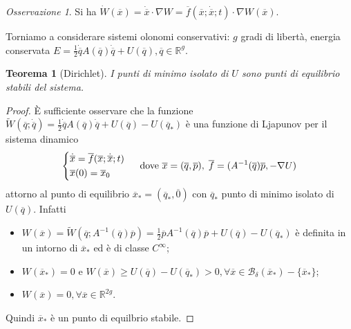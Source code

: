 \documentclass{book}
\theoremstyle{plain}
\newtheorem{teo}{Teorema}[chapter]
\theoremstyle{plain}
\theoremstyle{plain}
\theoremstyle{plain}
\theoremstyle{plain}
\theoremstyle{definition}
\theoremstyle{remark}
\newtheorem*{oss}{Osservazione}
\theoremstyle{definition}
\begin{document}
\begin{oss}
    Si ha $\dot{W}(\overline{x})=\dot{\overline{x}}\cdot \nabla W = \overline{f}(\overline{x};\dot{\overline{x}};t)\cdot \nabla W(\overline{x})$.
\end{oss}

\noindent Torniamo a considerare sistemi olonomi conservativi: $g$ gradi di libertà, energia conservata $E=\frac{1}{2}\dot{\overline{q}}A\left(\overline{q}\right)\dot{\overline{q}}+U\left(\overline{q}\right), \overline{q} \in \mathbb{R}^g$.

\begin{teo}[Dirichlet]
    I punti di minimo isolato di $U$ sono punti di equilibrio stabili del sistema.
\end{teo}

\begin{proof}
    È sufficiente osservare che la funzione $\widetilde{W}(\overline{q};\Dot{\overline{q}})=\frac{1}{2}\dot{\overline{q}}A\left(\overline{q}\right)\dot{\overline{q}}+U\left(\overline{q}\right)-U\left(\overline{q}_*\right)$ è una funzione di Ljapunov per il sistema dinamico
    \begin{displaymath}
        \begin{dcases}
            \Dot{\overline{x}}=\overline{f}(\overline{x};\Dot{\overline{x}};t) \\
            \overline{x}(0)=\overline{x}_0
        \end{dcases}
        \quad\text{ dove } \overline{x}=(\overline{q},\overline{p}), \; \overline{f}=(A^{-1}(\overline{q})\overline{p}, -\nabla U)
    \end{displaymath}
    attorno al punto di equilibrio $\overline{x}_*=(\overline{q}_*,\overline{0})$ con $\overline{q}_*$ punto di minimo isolato di $U(\overline{q})$.
    Infatti
    \begin{itemize}
        \item $W(\overline{x})=\widetilde{W}(\overline{q};A^{-1}(\overline{q})\overline{p})=\frac{1}{2}\overline{p}A^{-1}\left(\overline{q}\right)\overline{p}+U\left(\overline{q}\right)-U\left(\overline{q}_*\right)$ è definita in un intorno di $\overline{x}_*$ ed è di classe $C^\infty$;
        \item $W(\overline{x}_*)=0$ e $W(\overline{x})\geq U\left(\overline{q}\right)-U\left(\overline{q}_*\right)>0, \forall\overline{x}\in\mathcal{B}_{\delta}(\overline{x}_*)-\{\overline{x}_*\}$;
        \item $W(\overline{x})=0, \forall \overline{x}\in\mathbb{R}^{2g}$.
    \end{itemize}
    Quindi $\overline{x}_*$ è un punto di equilbrio stabile.
\end{proof}
\end{document}
